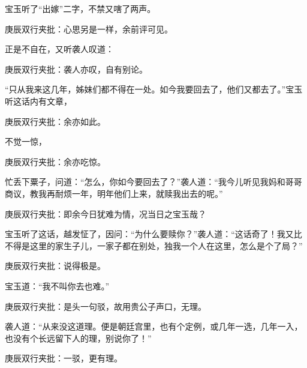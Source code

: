 \begin{parag}


    宝玉听了“出嫁”二字，不禁又嗐了两声。\begin{note}庚辰双行夹批：心思另是一样，余前评可见。\end{note}正是不自在，又听袭人叹道：\begin{note}庚辰双行夹批：袭人亦叹，自有别论。\end{note}“只从我来这几年，姊妹们都不得在一处。如今我要回去了，他们又都去了。”宝玉听这话内有文章，\begin{note}庚辰双行夹批：余亦如此。\end{note}不觉一惊，\begin{note}庚辰双行夹批：余亦吃惊。\end{note}忙丢下粟子，问道：“怎么，你如今要回去了？”袭人道：“我今儿听见我妈和哥哥商议，教我再耐烦一年，明年他们上来，就赎我出去的呢。”\begin{note}庚辰双行夹批：即余今日犹难为情，况当日之宝玉哉？\end{note}宝玉听了这话，越发怔了，因问：“为什么要赎你？”袭人道：“这话奇了！我又比不得是这里的家生子儿，一家子都在别处，独我一个人在这里，怎么是个了局？”\begin{note}庚辰双行夹批：说得极是。\end{note}宝玉道：“我不叫你去也难。”\begin{note}庚辰双行夹批：是头一句驳，故用贵公子声口，无理。\end{note}袭人道：“从来没这道理。便是朝廷宫里，也有个定例，或几年一选，几年一入，也没有个长远留下人的理，别说你了！”\begin{note}庚辰双行夹批：一驳，更有理。\end{note}
\end{parag}


